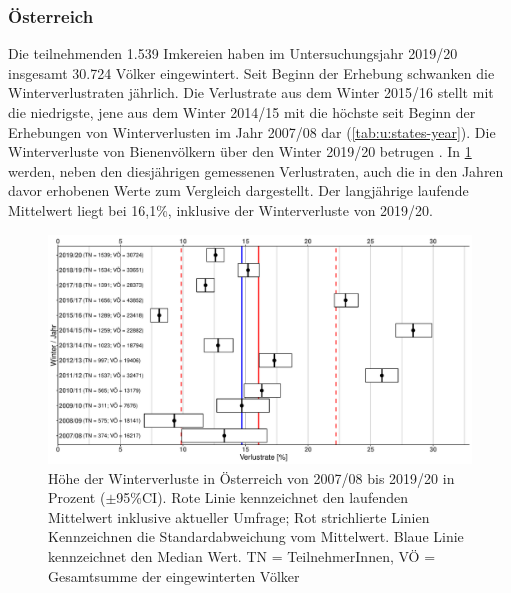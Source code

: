 \subsubsection{Österreich}

Die teilnehmenden 1.539 Imkereien haben im Untersuchungsjahr 2019/20 insgesamt 30.724 Völker eingewintert. Seit Beginn der Erhebung schwanken die Winterverlustraten jährlich. Die Verlustrate aus dem Winter 2015/16 stellt mit  die niedrigste, jene aus dem Winter 2014/15 mit  die höchste seit Beginn der Erhebungen von Winterverlusten im Jahr 2007/08 dar (\cref{tab:u:states-year}). Die Winterverluste von Bienenvölkern über den Winter 2019/20 betrugen . In \cref{fig:u:years:losses} werden, neben den diesjährigen gemessenen Verlustraten, auch die in den Jahren davor erhobenen Werte zum Vergleich dargestellt. Der langjährige laufende Mittelwert liegt bei 16,1\%, inklusive der Winterverluste von 2019/20.

\begin{figure}[H]
  \centering
  \includegraphics[keepaspectratio,width=1\textwidth]{project-U-wintersterblichkeit/figures/plot_years_losses}
  \caption{Höhe der Winterverluste in Österreich von 2007/08 bis 2019/20 in Prozent ($\pm$95\%CI). Rote Linie kennzeichnet den laufenden Mittelwert inklusive aktueller Umfrage; Rot strichlierte Linien Kennzeichnen die Standardabweichung vom Mittelwert. Blaue Linie kennzeichnet den Median Wert. TN = TeilnehmerInnen, VÖ = Gesamtsumme der eingewinterten Völker}
  \label{fig:u:years:losses}
\end{figure}
\newpage
{}

